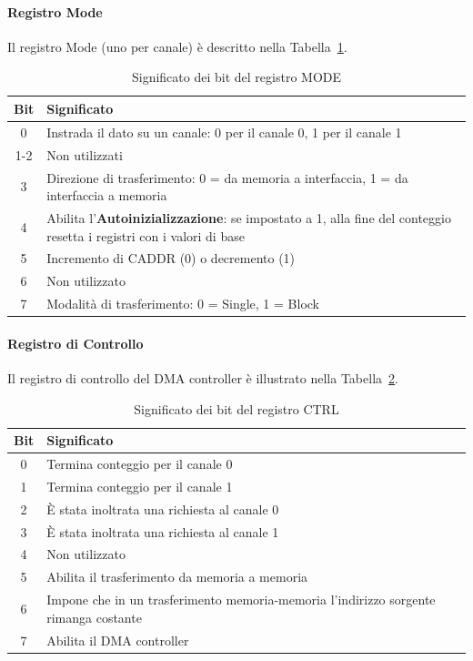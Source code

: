 \paragraph{Registro Mode}
Il registro Mode (uno per canale) è descritto nella Tabella~\ref{tab:MODE-8237}.
\begin{table}[ht]
    \centering
    \begin{tabular}{|c|p{11cm}|}
    \hline
    \textbf{Bit} & \textbf{Significato} \\ \hline
    0 & Instrada il dato su un canale: 0 per il canale 0, 1 per il canale 1 \\ \hline
    1-2 & Non utilizzati \\ \hline
    3 & Direzione di trasferimento: 0 = da memoria a interfaccia, 1 = da interfaccia a memoria \\ \hline
    4 & Abilita l'\textbf{Autoinizializzazione}: se impostato a 1, alla fine del conteggio resetta i registri con i valori di base \\ \hline
    5 & Incremento di CADDR (0) o decremento (1) \\ \hline
    6 & Non utilizzato \\ \hline
    7 & Modalità di trasferimento: 0 = Single, 1 = Block \\ \hline
    \end{tabular}
    \caption{Significato dei bit del registro MODE}
    \label{tab:MODE-8237}
\end{table}

\paragraph{Registro di Controllo}
Il registro di controllo del DMA controller è illustrato nella Tabella~\ref{tab:CTRL-8237}.
\begin{table}[ht]
    \centering
    \begin{tabular}{|c|p{11cm}|}
    \hline
    \textbf{Bit} & \textbf{Significato} \\ \hline
    0 & Termina conteggio per il canale 0 \\ \hline
    1 & Termina conteggio per il canale 1 \\ \hline
    2 & È stata inoltrata una richiesta al canale 0 \\ \hline
    3 & È stata inoltrata una richiesta al canale 1 \\ \hline
    4 & Non utilizzato \\ \hline
    5 & Abilita il trasferimento da memoria a memoria \\ \hline
    6 & Impone che in un trasferimento memoria-memoria l'indirizzo sorgente rimanga costante \\ \hline
    7 & Abilita il DMA controller \\ \hline
    \end{tabular}
    \caption{Significato dei bit del registro CTRL}
    \label{tab:CTRL-8237}
\end{table}

